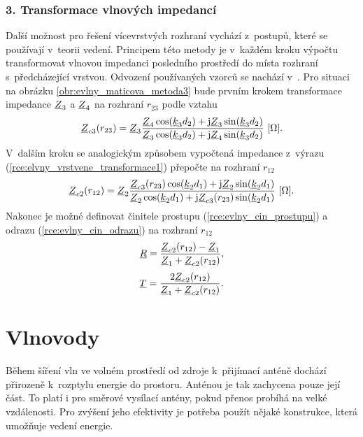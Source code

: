 \subsubsection*{3. Transformace vlnových impedancí}
Další možnost pro řešení vícevrstvých rozhraní vychází z~postupů, které se používají v~teorii vedení. Principem této metody je v~každém kroku výpočtu transformovat vlnovou impedanci posledního prostředí do místa rozhraní s~předcházející vrstvou. 
Odvození používaných vzorců se nachází v~\cite[str. 106]{emp}.
Pro situaci na obrázku \ref{obr:evlny_maticova_metoda3} bude prvním krokem transformace impedance ${\underline{Z}}_{3}$ a ${\underline{Z}}_{4}$ na rozhraní $r_{23}$ podle vztahu
\begin{equation}
	{\underline{Z}}_{c3}(r_{23}) = {\underline{Z}}_{3}\frac{{\underline{Z}}_{4}\cos({\underline{k}}_{3}d_{2})+\mathrm{j}{\underline{Z}}_{3}\sin({\underline{k}}_{3}d_{2})}{{\underline{Z}}_{3}\cos({\underline{k}}_{3}d_{2})+\mathrm{j}{\underline{Z}}_{4}\sin({\underline{k}}_{3}d_{2})}\mathrm{\ [\Omega]}.
	\label{rce:elvny_vrstvene_transformace1}
\end{equation}
V~dalším kroku se analogickým způsobem vypočtená impedance z~výrazu (\ref{rce:elvny_vrstvene_transformace1}) přepočte na rozhraní $r_{12}$
\begin{equation}
	{\underline{Z}}_{c2}(r_{12}) = {\underline{Z}}_{2}\frac{{\underline{Z}}_{c3}(r_{23})\cos({\underline{k}}_{2}d_{1})+\mathrm{j}{\underline{Z}}_{2}\sin({\underline{k}}_{2}d_{1})}{{\underline{Z}}_{2}\cos({\underline{k}}_{2}d_{1})+\mathrm{j}{\underline{Z}}_{c3}(r_{23})\sin({\underline{k}}_{2}d_{1})}\mathrm{\ [\Omega]}.
	\label{rce:elvny_vrstvene_transformace2}
\end{equation}
Nakonec je možné definovat činitele prostupu (\ref{rce:evlny_cin_prostupu}) a odrazu (\ref{rce:evlny_cin_odrazu}) na rozhraní $r_{12}$
\begin{equation}
	{\underline{R}} = \frac{{\underline{Z}}_{c2}(r_{12}) - {\underline{Z}}_{1}}{{\underline{Z}}_{1} + {\underline{Z}}_{c2}(r_{12})}
	\label{rce:elvny_vrstvene_transf_R},
\end{equation}
\begin{equation}
	{\underline{T}} = \frac{2{\underline{Z}}_{c2}(r_{12})}{{\underline{Z}}_{1} + {\underline{Z}}_{c2}(r_{12})}
	\label{rce:elvny_vrstvene_transf_T}.
\end{equation}
\newpage

\section{Vlnovody}
Během šíření vln ve volném prostředí od zdroje k~přijímací anténě dochází přirozeně k~rozptylu energie do prostoru. Anténou je tak zachycena pouze její část. To platí i pro směrové vysílací antény, pokud přenos probíhá na velké vzdálenosti. Pro zvýšení jeho efektivity je potřeba použít nějaké konstrukce, která umožňuje vedení energie.

